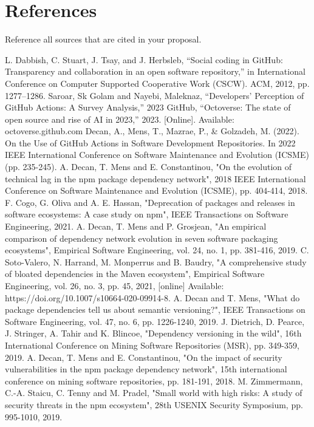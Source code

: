 \documentclass[conference]{IEEEtran}
\begin{document}
\section*{References}
Reference all sources that are cited in your proposal.

\begin{thebibliography}{00}
 L. Dabbish, C. Stuart, J. Tsay, and J. Herbsleb, ``Social coding in GitHub: Transparency and collaboration in an open software repository,'' in International Conference on Computer Supported Cooperative Work (CSCW). ACM, 2012, pp. 1277–1286.
 Saroar, Sk Golam and Nayebi, Maleknaz, ``Developers' Perception of GitHub Actions: A Survey Analysis,'' 2023
 GitHub, “Octoverse: The state of open source and rise of AI in 2023,” 2023. [Online]. Available: octoverse.github.com
 Decan, A., Mens, T., Mazrae, P., \& Golzadeh, M. (2022). On the Use of GitHub Actions in Software Development Repositories. In 2022 IEEE International Conference on Software Maintenance and Evolution (ICSME) (pp. 235-245).
 A. Decan, T. Mens and E. Constantinou, "On the evolution of technical lag in the npm package dependency network", 2018 IEEE International Conference on Software Maintenance and Evolution (ICSME), pp. 404-414, 2018.
 F. Cogo, G. Oliva and A. E. Hassan, "Deprecation of packages and releases in software ecosystems: A case study on npm", IEEE Transactions on Software Engineering, 2021.
 A. Decan, T. Mens and P. Grosjean, "An empirical comparison of dependency network evolution in seven software packaging ecosystems", Empirical Software Engineering, vol. 24, no. 1, pp. 381-416, 2019.
  C. Soto-Valero, N. Harrand, M. Monperrus and B. Baudry, "A comprehensive study of bloated dependencies in the Maven ecosystem", Empirical Software Engineering, vol. 26, no. 3, pp. 45, 2021, [online] Available: https://doi.org/10.1007/s10664-020-09914-8.
 A. Decan and T. Mens, "What do package dependencies tell us about semantic versioning?", IEEE Transactions on Software Engineering, vol. 47, no. 6, pp. 1226-1240, 2019.
 J. Dietrich, D. Pearce, J. Stringer, A. Tahir and K. Blincoe, "Dependency versioning in the wild", 16th International Conference on Mining Software Repositories (MSR), pp. 349-359, 2019.
A. Decan, T. Mens and E. Constantinou, "On the impact of security vulnerabilities in the npm package dependency network", 15th international conference on mining software repositories, pp. 181-191, 2018.
 M. Zimmermann, C.-A. Staicu, C. Tenny and M. Pradel, "Small world with high risks: A study of security threats in the npm ecosystem", 28th USENIX Security Symposium, pp. 995-1010, 2019.

\end{thebibliography}
\end{document}
